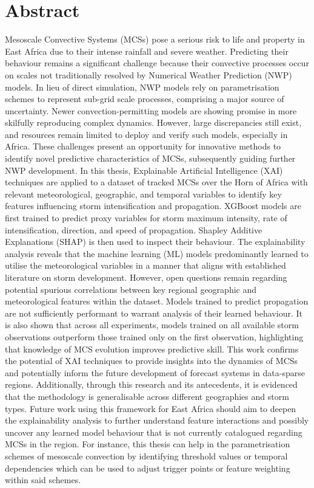 \chapter*{\center \Large  Abstract}

\noindent
Mesoscale Convective Systems (MCSs) pose a serious risk to life and property in East Africa due to their intense rainfall and severe weather. Predicting their behaviour remains a significant challenge because their convective processes occur on scales not traditionally resolved by Numerical Weather Prediction (NWP) models. In lieu of direct simulation, NWP models rely on parametrisation schemes to represent sub-grid scale processes, comprising a major source of uncertainty. Newer convection-permitting models are showing promise in more skilfully reproducing complex dynamics. However, large discrepancies still exist, and resources remain limited to deploy and verify such models, especially in Africa. These challenges present an opportunity for innovative methods to identify novel predictive characteristics of MCSs, subsequently guiding further NWP development. In this thesis, Explainable Artificial Intelligence (XAI) techniques are applied to a dataset of tracked MCSs over the Horn of Africa with relevant meteorological, geographic, and temporal variables to identify key features influencing storm intensification and propagation. XGBoost models are first trained to predict proxy variables for storm maximum intensity, rate of intensification, direction, and speed of propagation. Shapley Additive Explanations (SHAP) is then used to inspect their behaviour. The explainability analysis reveals that the machine learning (ML) models predominantly learned to utilise the meteorological variables in a manner that aligns with established literature on storm development. However, open questions remain regarding potential spurious correlations between key regional geographic and meteorological features within the dataset. Models trained to predict propagation are not sufficiently performant to warrant analysis of their learned behaviour. It is also shown that across all experiments, models trained on all available storm observations outperform those trained only on the first observation, highlighting that knowledge of MCS evolution improves predictive skill. This work confirms the potential of XAI techniques to provide insights into the dynamics of MCSs and potentially inform the future development of forecast systems in data-sparse regions. Additionally, through this research and its antecedents, it is evidenced that the methodology is generalisable across different geographies and storm types. Future work using this framework for East Africa should aim to deepen the explainability analysis to further understand feature interactions and possibly uncover any learned model behaviour that is not currently catalogued regarding MCSs in the region. For instance, this thesis can help in the parametrisation schemes of mesoscale convection by identifying threshold values or temporal dependencies which can be used to adjust trigger points or feature weighting within said schemes.

